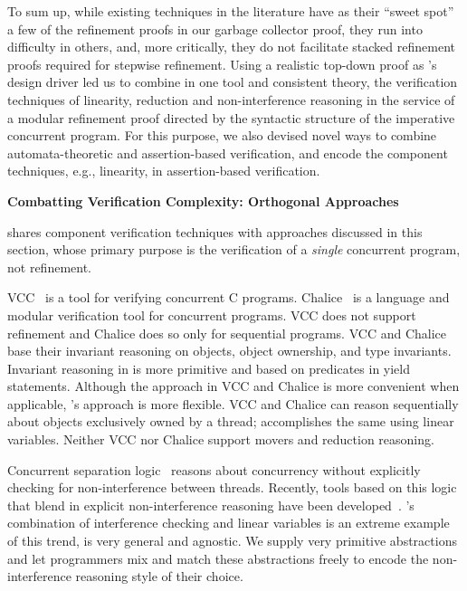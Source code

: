 To sum up, while existing techniques in the literature have as their
``sweet spot'' a few of the refinement proofs in our garbage collector
proof, they run into difficulty in others, and, more critically, they
do not facilitate stacked refinement proofs required for stepwise
refinement. Using a realistic top-down proof as \civl's design driver led us to
combine in one tool and consistent theory, the verification techniques
of linearity, reduction and non-interference reasoning in the service
of a modular refinement proof directed by the syntactic structure of
the imperative concurrent program. For this purpose, we also devised
novel ways to combine automata-theoretic and assertion-based
verification, and encode the component techniques, e.g., linearity, in
assertion-based verification. 

{\bf Combatting Verification Complexity: Orthogonal Approaches} 

\civl shares component verification techniques with approaches
discussed in this section, whose primary purpose is the verification
of a {\em single} concurrent program, not refinement. 

VCC~\cite{VCC} is a tool for verifying concurrent C programs.  
Chalice~\cite{LM09} is a language and modular verification tool for concurrent programs. 
VCC does not support refinement and Chalice does so only for sequential programs.  
VCC and Chalice base their invariant reasoning on objects, object ownership, and type invariants. 
Invariant reasoning in \civl is more primitive and based on predicates in yield statements. 
Although the approach in VCC and Chalice is more convenient when applicable, \civl's approach is more flexible. 
VCC and Chalice can reason sequentially about objects exclusively owned by a thread;
\civl accomplishes the same using linear variables.
Neither VCC nor Chalice support movers and reduction reasoning.

Concurrent separation logic~\cite{OHearn07} reasons about concurrency without 
explicitly checking for non-interference between threads. 
Recently, tools based on this logic that blend in explicit non-interference reasoning have been developed~\cite{SAGL,RGSep}. 
\civl's combination of interference checking and linear variables is
an extreme example of this trend, is very general and agnostic. We supply very primitive abstractions and let programmers mix and
match these abstractions freely to encode the non-interference
reasoning style of their choice. 
